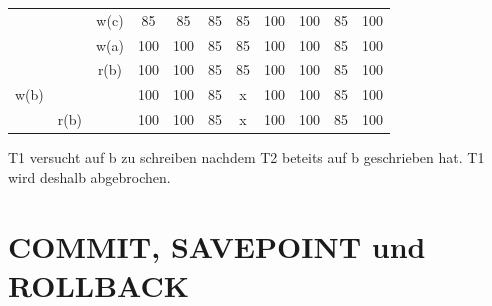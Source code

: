 \documentclass[12pt]{scrartcl}
\begin{document}
\begin{tabular}{ | c | c | c | c | c | c | c | c | c | c | c | }
	     &      & w(c) & 85                        & 85                          & 85                          & 85                          & 100  & 100  & 85   & 100  \\
	     &      & w(a) & 100                       & 100                         & 85                          & 85                          & 100  & 100  & 85   & 100  \\
	     &      & r(b) & 100                       & 100                         & 85                          & 85                          & 100  & 100  & 85   & 100  \\
	w(b) &      &      & 100                       & 100                         & 85                          & x                           & 100  & 100  & 85   & 100  \\
	     & r(b) &      & 100                       & 100                         & 85                          & x                           & 100  & 100  & 85   & 100  \\
	\hline
\end{tabular}

T1 versucht auf b zu schreiben nachdem T2 beteits auf b geschrieben hat. T1 wird deshalb abgebrochen.

\section{COMMIT, SAVEPOINT und ROLLBACK}
\end{document}

